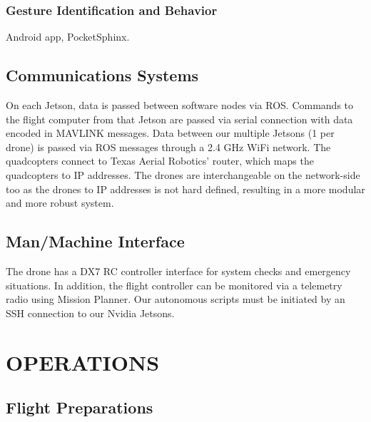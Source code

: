 \documentclass[12pt,letterpaper]{article}
\begin{document}
		\subsubsection*{Gesture Identification and Behavior}
			Android app, PocketSphinx.

	\subsection*{Communications Systems}
		On each Jetson, data is passed between software nodes via ROS. Commands to the flight computer from that Jetson are passed via serial connection with data encoded in MAVLINK messages. Data between our multiple Jetsons (1 per drone) is passed via ROS messages through a 2.4 GHz WiFi network. The quadcopters connect to Texas Aerial Robotics’ router, which maps the quadcopters to IP addresses. The drones are interchangeable on the network-side too as the drones to IP addresses is not hard defined, resulting in a more modular and more robust system.

	\subsection*{Man/Machine Interface}
		The drone has a DX7 RC controller interface for system checks and emergency situations. In addition, the flight controller can be monitored via a telemetry radio using Mission Planner. Our autonomous scripts must be initiated by an SSH connection to our Nvidia Jetsons.

\section*{OPERATIONS}
	\subsection*{Flight Preparations}
\end{document}
